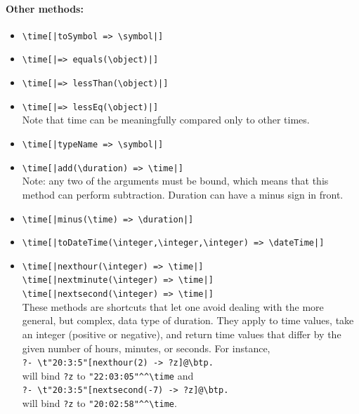 \documentclass[11pt]{article}
\newcommand{\bs}{\textbackslash}
\begin{document}
\paragraph{Other methods:}
\begin{itemize}
\item {\tt \bs{}time[|toSymbol => \bs{}symbol|]}
\item {\tt \bs{}time[|=> equals(\bs{}object)|]}
\item {\tt \bs{}time[|=> lessThan(\bs{}object)|]}
\item {\tt \bs{}time[|=> lessEq(\bs{}object)|]}
  \\
  Note that time can be meaningfully compared only to other times.
\item {\tt \bs{}time[|typeName => \bs{}symbol|]}
\item {\tt \bs{}time[|add(\bs{}duration) => \bs{}time|] }
  \\
  Note: any two of the arguments must be bound, which means that this
  method can perform subtraction.
    Duration can have a minus sign in front.
\item {\tt \bs{}time[|minus(\bs{}time) => \bs{}duration|] }
\item {\tt \bs{}time[|toDateTime(\bs{}integer,\bs{}integer,\bs{}integer) => \bs{}dateTime|]}    
\item {\tt \bs{}time[|nexthour(\bs{}integer) => \bs{}time|]}  
  \\
  \texttt{\bs{}time[|nextminute(\bs{}integer) => \bs{}time|]}
  \\
  \texttt{\bs{}time[|nextsecond(\bs{}integer) => \bs{}time|]}
  \\
  These methods are shortcuts that let one avoid dealing with the more
  general, but complex, data type of duration.
  They apply to time values, take an integer (positive or negative), and return time
  values that differ by the given number of hours, minutes, or seconds.
  For instance,
  \\
  \hspace*{1cm}\verb|?- \t"20:3:5"[nexthour(2) -> ?z]@\btp.|
  \\
  will bind \texttt{?z} to \verb|"22:03:05"^^\time| and 
  \\
  \hspace*{1cm}\verb|?- \t"20:3:5"[nextsecond(-7) -> ?z]@\btp.|
  \\
  will bind \texttt{?z} to  \verb|"20:02:58"^^\time|.
\end{itemize}
\end{document}
